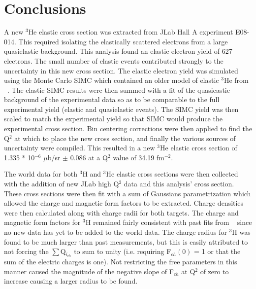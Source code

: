 \chapter{Conclusions} %
\label{ch:conclusions} %

A new $^3$He elastic cross section was extracted from JLab Hall A experiment E08-014. This required isolating the elastically scattered electrons from a large quasielastic background. This analysis found an elastic electron yield of 627 electrons. The small number of elastic events contributed strongly to the uncertainty in this new cross section. The elastic electron yield was simulated using the Monte Carlo SIMC which contained an older model of elastic $^3$He from ~\cite{Article:Amroun}. The elastic SIMC results were then summed with a fit of the quasieastic background of the experimental data so as to be comparable to the full experimental yield (elastic and quasielastic events). The SIMC yield was then scaled to match the experimental yield so that SIMC would produce the experimental cross section. Bin centering corrections were then applied to find the Q$^2$ at which to place the new cross section, and finally the various sources of uncertainty were compiled. This resulted in a new $^3$He elastic cross section of 1.335 * 10$^{-6}$ $\mu$b/sr $\pm$ 0.086 at a Q$^2$ value of 34.19 fm$^{-2}$. 

The world data for both $^3$H and $^3$He elastic cross sections were then collected with the addition of new JLab high Q$^2$ data and this analysis' cross section. These cross sections were then fit with a sum of Gaussians parametrization which allowed the charge and magnetic form factors to be extracted. Charge densities were then calculated along with charge radii for both targets. The charge and magnetic form factors for $^3$H remained fairly consistent with past fits from ~\cite{Article:Amroun} since no new data has yet to be added to the world data. The charge radius for $^3$H was found to be much larger than past measurements, but this is easily attributed to not forcing the $\sum$Q$_{i_{ch}}$ to sum to unity (i.e. requiring F$_{ch}(0)$ = 1 or that the sum of the electric charges is one). Not restricting the free parameters in this manner caused the magnitude of the negative slope of F$_{ch}$ at Q$^2$ of zero to increase causing a larger radius to be found.


